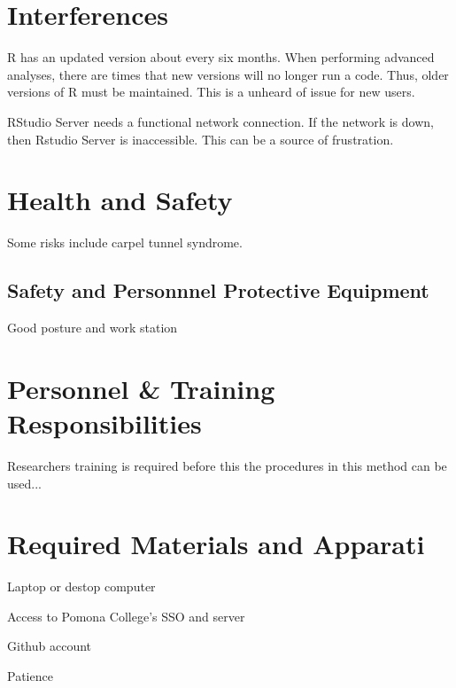 \documentclass[12pt]{../SOP3_beta}
\begin{document}
\section{Interferences}

\NP R has an updated version about every six months. When performing advanced analyses, there are times that new versions will no longer run a code. Thus, older versions of R must be maintained. This is a unheard of issue for new users.

\NP RStudio Server needs a functional network connection. If the network is down, then Rstudio Server is inaccessible. This can be a source of frustration. 

\section{Health and Safety}

\NP Some risks include carpel tunnel syndrome. 


\subsection*{Safety and Personnnel Protective Equipment}

\NP Good posture and work station

\section{Personnel \& Training Responsibilities}

\NP Researchers training is required before this the procedures in this method can be used... 


\section{Required Materials and Apparati}

\NP Laptop or destop computer

\NP Access to Pomona College's SSO and server

\NP Github account

\NP Patience

\end{document}
